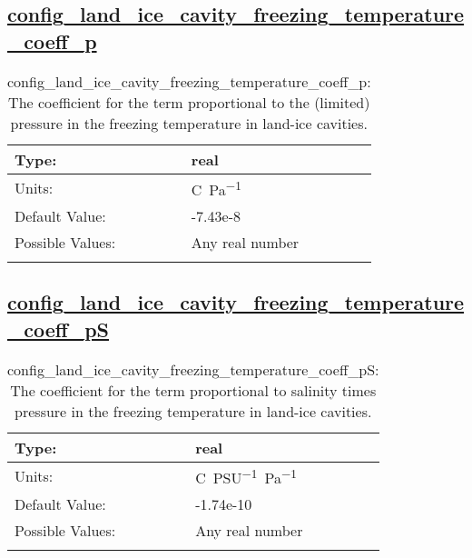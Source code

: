 \subsection[config\_land\_ice\_cavity\_freezing\_temperature\_coeff\_p]{\hyperref[sec:nm_tab_eos]{config\_land\_ice\_cavity\_freezing\_temperature\_coeff\_p}}
\label{subsec:nm_sec_config_land_ice_cavity_freezing_temperature_coeff_p}
\begin{center}
\begin{longtable}{| p{2.0in} || p{4.0in} |}
    \hline
    Type: & real \\
    \hline
    Units: & \si{C.Pa^{-1}} \\
    \hline
    Default Value: & -7.43e-8 \\
    \hline
    Possible Values: & Any real number \\
    \hline
    \caption{config\_land\_ice\_cavity\_freezing\_temperature\_coeff\_p: The coefficient for the term proportional to the (limited) pressure in the freezing temperature in land-ice cavities.}
\end{longtable}
\end{center}
\subsection[config\_land\_ice\_cavity\_freezing\_temperature\_coeff\_pS]{\hyperref[sec:nm_tab_eos]{config\_land\_ice\_cavity\_freezing\_temperature\_coeff\_pS}}
\label{subsec:nm_sec_config_land_ice_cavity_freezing_temperature_coeff_pS}
\begin{center}
\begin{longtable}{| p{2.0in} || p{4.0in} |}
    \hline
    Type: & real \\
    \hline
    Units: & \si{C.PSU^{-1}.Pa^{-1}} \\
    \hline
    Default Value: & -1.74e-10 \\
    \hline
    Possible Values: & Any real number \\
    \hline
    \caption{config\_land\_ice\_cavity\_freezing\_temperature\_coeff\_pS: The coefficient for the term proportional to salinity times pressure in the freezing temperature in land-ice cavities.}
\end{longtable}
\end{center}
